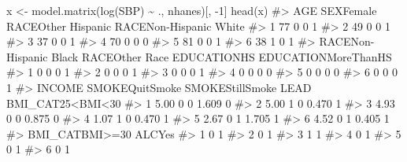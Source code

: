 \documentclass[
  letterpaper,
]{latex/krantz}
\makeatletter
\newenvironment{Shaded}{\begin{snugshade}}{\end{snugshade}}
\newcommand{\CommentTok}[1]{\textcolor[rgb]{0.37,0.37,0.37}{#1}}
\newcommand{\DecValTok}[1]{\textcolor[rgb]{0.68,0.00,0.00}{#1}}
\newcommand{\FunctionTok}[1]{\textcolor[rgb]{0.28,0.35,0.67}{#1}}
\newcommand{\NormalTok}[1]{\textcolor[rgb]{0.00,0.23,0.31}{#1}}
\newcommand{\OtherTok}[1]{\textcolor[rgb]{0.00,0.23,0.31}{#1}}
\newcommand{\SpecialCharTok}[1]{\textcolor[rgb]{0.37,0.37,0.37}{#1}}
\newenvironment{kframe}{%
\medskip{}
\setlength{\fboxsep}{.8em}
 \def\at@end@of@kframe{}%
 \ifinner\ifhmode%
  \def\at@end@of@kframe{\end{minipage}}%
  \begin{minipage}{\columnwidth}%
 \fi\fi%
 \def\FrameCommand##1{\hskip\@totalleftmargin \hskip-\fboxsep
 \colorbox{shadecolor}{##1}\hskip-\fboxsep
     \hskip-\linewidth \hskip-\@totalleftmargin \hskip\columnwidth}%
 \MakeFramed {\advance\hsize-\width
   \@totalleftmargin\z@ \linewidth\hsize
   \@setminipage}}%
 {\par\unskip\endMakeFramed%
 \at@end@of@kframe}
\renewenvironment{Shaded}{\begin{kframe}}{\end{kframe}}
\makeatother
\begin{document}
\begin{Shaded}
\begin{Highlighting}[]
\NormalTok{x }\OtherTok{\textless{}{-}} \FunctionTok{model.matrix}\NormalTok{(}\FunctionTok{log}\NormalTok{(SBP) }\SpecialCharTok{\textasciitilde{}}\NormalTok{ ., nhanes)[, }\SpecialCharTok{{-}}\DecValTok{1}\NormalTok{]}
\FunctionTok{head}\NormalTok{(x)}
\CommentTok{\#\textgreater{}   AGE SEXFemale RACEOther Hispanic RACENon{-}Hispanic White}
\CommentTok{\#\textgreater{} 1  77         0                  0                      1}
\CommentTok{\#\textgreater{} 2  49         0                  0                      1}
\CommentTok{\#\textgreater{} 3  37         0                  0                      1}
\CommentTok{\#\textgreater{} 4  70         0                  0                      0}
\CommentTok{\#\textgreater{} 5  81         0                  0                      1}
\CommentTok{\#\textgreater{} 6  38         1                  0                      1}
\CommentTok{\#\textgreater{}   RACENon{-}Hispanic Black RACEOther Race EDUCATIONHS EDUCATIONMoreThanHS}
\CommentTok{\#\textgreater{} 1                      0              0           0                   1}
\CommentTok{\#\textgreater{} 2                      0              0           0                   1}
\CommentTok{\#\textgreater{} 3                      0              0           0                   1}
\CommentTok{\#\textgreater{} 4                      0              0           0                   0}
\CommentTok{\#\textgreater{} 5                      0              0           0                   0}
\CommentTok{\#\textgreater{} 6                      0              0           0                   1}
\CommentTok{\#\textgreater{}   INCOME SMOKEQuitSmoke SMOKEStillSmoke  LEAD BMI\_CAT25\textless{}BMI\textless{}30}
\CommentTok{\#\textgreater{} 1   5.00              0               0 1.609                0}
\CommentTok{\#\textgreater{} 2   5.00              1               0 0.470                1}
\CommentTok{\#\textgreater{} 3   4.93              0               0 0.875                0}
\CommentTok{\#\textgreater{} 4   1.07              1               0 0.470                1}
\CommentTok{\#\textgreater{} 5   2.67              0               1 1.705                1}
\CommentTok{\#\textgreater{} 6   4.52              0               1 0.405                1}
\CommentTok{\#\textgreater{}   BMI\_CATBMI\textgreater{}=30 ALCYes}
\CommentTok{\#\textgreater{} 1              0      1}
\CommentTok{\#\textgreater{} 2              0      1}
\CommentTok{\#\textgreater{} 3              1      1}
\CommentTok{\#\textgreater{} 4              0      1}
\CommentTok{\#\textgreater{} 5              0      1}
\CommentTok{\#\textgreater{} 6              0      1}
\end{Highlighting}
\end{Shaded}
\end{document}
